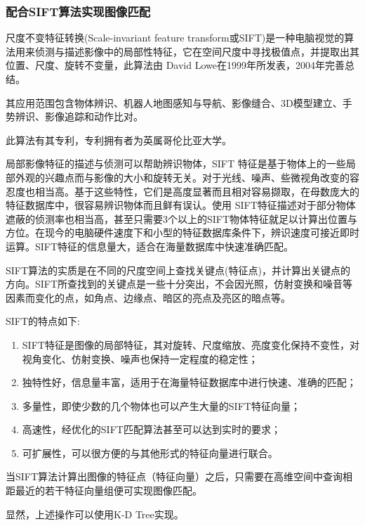 \documentclass{article}
\begin{document}
\subsubsection{配合SIFT算法实现图像匹配}
尺度不变特征转换(Scale-invariant feature transform或SIFT)是一种电脑视觉的算法用来侦测与描述影像中的局部性特征，它在空间尺度中寻找极值点，并提取出其位置、尺度、旋转不变量，此算法由 David Lowe在1999年所发表，2004年完善总结。\par
其应用范围包含物体辨识、机器人地图感知与导航、影像缝合、3D模型建立、手势辨识、影像追踪和动作比对。\cite{ref8}\par
此算法有其专利，专利拥有者为英属哥伦比亚大学。\par
局部影像特征的描述与侦测可以帮助辨识物体，SIFT 特征是基于物体上的一些局部外观的兴趣点而与影像的大小和旋转无关。对于光线、噪声、些微视角改变的容忍度也相当高。基于这些特性，它们是高度显著而且相对容易撷取，在母数庞大的特征数据库中，很容易辨识物体而且鲜有误认。使用 SIFT特征描述对于部分物体遮蔽的侦测率也相当高，甚至只需要3个以上的SIFT物体特征就足以计算出位置与方位。在现今的电脑硬件速度下和小型的特征数据库条件下，辨识速度可接近即时运算。SIFT特征的信息量大，适合在海量数据库中快速准确匹配。\cite{ref9}\par
SIFT算法的实质是在不同的尺度空间上查找关键点(特征点)，并计算出关键点的方向。SIFT所查找到的关键点是一些十分突出，不会因光照，仿射变换和噪音等因素而变化的点，如角点、边缘点、暗区的亮点及亮区的暗点等。\cite{ref9}\par
SIFT的特点如下\cite{ref10}:\par
\begin{enumerate}
    \item {SIFT特征是图像的局部特征，其对旋转、尺度缩放、亮度变化保持不变性，对视角变化、仿射变换、噪声也保持一定程度的稳定性；}
    \item {独特性好，信息量丰富，适用于在海量特征数据库中进行快速、准确的匹配；}
    \item {多量性，即使少数的几个物体也可以产生大量的SIFT特征向量；}
    \item {高速性，经优化的SIFT匹配算法甚至可以达到实时的要求；}
    \item {可扩展性，可以很方便的与其他形式的特征向量进行联合。}
\end{enumerate} \par
当SIFT算法计算出图像的特征点（特征向量）之后，只需要在高维空间中查询相距最近的若干特征向量组便可实现图像匹配。\par
显然，上述操作可以使用K-D Tree实现。
\end{document}
